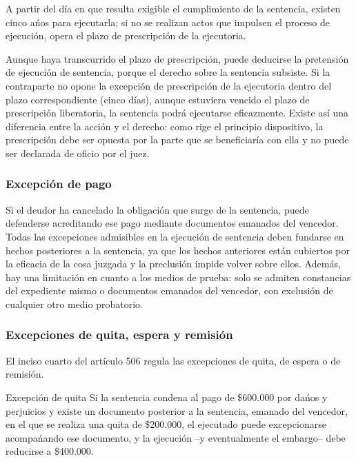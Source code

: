 \documentclass[12pt,oneside]{book}
\begin{document}
A partir del d\'ia en que resulta exigible el cumplimiento de la sentencia, existen cinco a\'nos para ejecutarla; si no se realizan actos que impulsen el proceso de ejecuci\'on, opera el plazo de prescripci\'on de la ejecutoria.

\begin{note}
Aunque haya transcurrido el plazo de prescripci\'on, puede deducirse la pretensi\'on de ejecuci\'on de sentencia, porque el derecho sobre la sentencia subsiste. Si la contraparte no opone la excepci\'on de prescripci\'on de la ejecutoria dentro del plazo correspondiente (cinco d\'ias), aunque estuviera vencido el plazo de prescripci\'on liberatoria, la sentencia podr\'a ejecutarse eficazmente. Existe as\'i una diferencia entre la acci\'on y el derecho: como rige el principio dispositivo, la prescripci\'on debe ser opuesta por la parte que se beneficiar\'ia con ella y no puede ser declarada de oficio por el juez.
\end{note}

\subsubsection{Excepci\'on de pago}

Si el deudor ha cancelado la obligaci\'on que surge de la sentencia, puede defenderse acreditando ese pago mediante documentos emanados del vencedor. Todas las excepciones admisibles en la ejecuci\'on de sentencia deben fundarse en hechos posteriores a la sentencia, ya que los hechos anteriores est\'an cubiertos por la eficacia de la cosa juzgada y la preclusi\'on impide volver sobre ellos. Adem\'as, hay una limitaci\'on en cuanto a los medios de prueba: solo se admiten constancias del expediente mismo o documentos emanados del vencedor, con exclusi\'on de cualquier otro medio probatorio.

\subsubsection{Excepciones de quita, espera y remisi\'on}

El inciso cuarto del art\'iculo 506 regula las excepciones de quita, de espera o de remisi\'on.

\begin{example}{Excepci\'on de quita}
Si la sentencia condena al pago de \$600.000 por da\'nos y perjuicios y existe un documento posterior a la sentencia, emanado del vencedor, en el que se realiza una quita de \$200.000, el ejecutado puede excepcionarse acompa\'nando ese documento, y la ejecuci\'on --y eventualmente el embargo-- debe reducirse a \$400.000.
\end{example}
\end{document}
